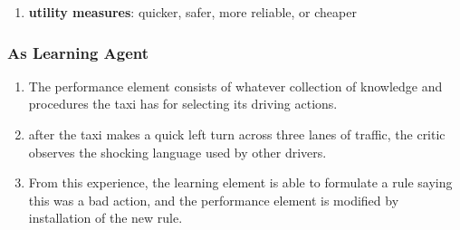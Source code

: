 \begin{enumerate}[itemsep=0.2cm]
    \item \textbf{utility measures}: quicker, safer, more reliable, or cheaper 
    \hfill \cite{ai/book/Artificial-Intelligence-A-Modern-Approach/Russell-Norvig}
\end{enumerate}


\subsubsection{As Learning Agent}

\begin{enumerate}[itemsep=0.2cm]
    \item The performance element consists of whatever collection of knowledge and procedures the taxi has for selecting its driving actions.
    \hfill \cite{ai/book/Artificial-Intelligence-A-Modern-Approach/Russell-Norvig}

    \item  after the taxi makes a quick left turn across three lanes of traffic, the critic observes the shocking language used by other drivers.
    \hfill \cite{ai/book/Artificial-Intelligence-A-Modern-Approach/Russell-Norvig}

    \item From this experience, the learning element is able to formulate a rule saying this was a bad action, and the performance element is modified by installation of the new rule. 
    \hfill \cite{ai/book/Artificial-Intelligence-A-Modern-Approach/Russell-Norvig}

    
\end{enumerate}









